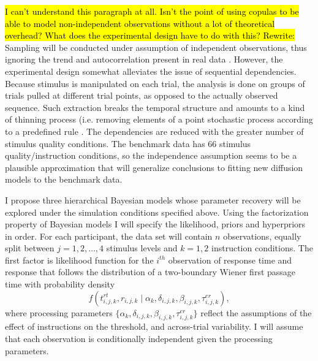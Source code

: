 \documentclass[12pt]{article}
\newcommand{\trish}[1]{\textrm{\hl{#1}}}
\begin{document}
\trish{I can't understand this paragraph at all.  Isn't the point of
using copulas to be able to model non-independent observations without
a lot of theoretical overhead?  What does the experimental design have
to do with this?  Rewrite:} Sampling will be conducted under assumption
of independent observations, thus ignoring the trend and
autocorrelation present in real data
\citep{PerVan2002,CraPer2010}. However, the experimental design
somewhat alleviates the issue of sequential dependencies. Because
stimulus is manipulated on each trial, the analysis is done on groups
of trials pulled at different trial points, as opposed to the actually
observed sequence. Such extraction breaks the temporal structure and
amounts to a kind of thinning process (i.e. removing elements of a
point stochastic process according to a predefined rule
\citep{RobCas2004,GamLop2006,GelCar2013,Ros2014}. The dependencies are
reduced with the greater number of stimulus quality conditions. The
benchmark data has 66 stimulus quality/instruction
conditions, so the independence assumption seems to be a plausible
approximation that will generalize conclusions to fitting new
diffusion models to the benchmark data.
    
I propose three hierarchical Bayesian models whose parameter recovery will be explored under the simulation conditions
specified above. Using the factorization property of Bayesian models
I will specify the likelihood, priors and hyperpriors in order. For
each participant, the data set will contain $n$ observations, equally
split between $j = 1, 2, \dots, 4$ stimulus levels and $k = 1, 2$
instruction conditions. The first factor is likelihood function for the $i^{th}$ observation of response time and
response that follows the distribution of a two-boundary Wiener
first passage time with probability density
%
\begin{equation}
f(t_{i,j,k}^{rt}, r_{i,j,k} \mid \alpha_k, \delta_{i,j,k}, \beta_{i,j,k}, \tau_{i,j,k}^{er}),
\end{equation}
%
where processing parameters $
\{\alpha_k, \delta_{i,j,k}, \beta_{i,j,k}, \tau_{i,j,k}^{er}\}$ reflect the
assumptions of the effect of instructions on the threshold,
and across-trial variability. I will assume that each observation is
conditionally independent given the processing parameters.
\end{document}
